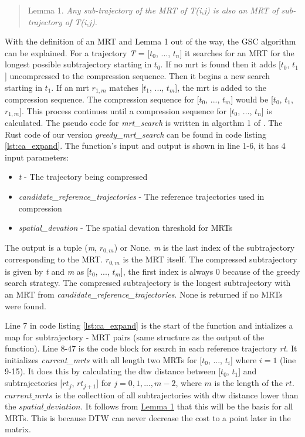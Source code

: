 \begin{quote}
    \label{lemma}
    Lemma 1. \textit{Any sub-trajectory of the MRT of T(i,j) is also an MRT of sub-trajectory of T(i,j).}
\end{quote}

With the definition of an MRT and Lemma 1 out of the way, the GSC algorithm can be explained.
For a trajectory \textit{T} = [$t_0$, ..., $t_n$] it searches for an MRT for the longest possible subtrajectory starting in $t_0$. If no \acrshort{mrt} is found then it adds [$t_0$, $t_1$] uncompressed to the compression sequence. Then it begins a new search starting in $t_1$. If an \acrshort{mrt} $r_{1,m}$ matches [$t_1$, ..., $t_m$], the \acrshort{mrt} is added to the compression sequence. The compression sequence for [$t_0$, ..., $t_m$] would be [$t_0$, $t_1$, $r_{1,m}$]. This process continues until a compression sequence for [$t_0$, ..., $t_n$] is calculated. The pseudo code for \textit{mrt\_search} is written in algorthm 1 of \textcite{zhao2018rest}. The Rust code of our version \textit{greedy\_mrt\_search} can be found in code listing \ref{lst:ca_expand}. The function's input and output is shown in line 1-6, it has 4 input parameters:



\begin{itemize}
    \item{\textit{t} - The trajectory being compressed}
    \item{\textit{candidate\_reference\_trajectories} - The reference trajectories used in compression}
    \item{\textit{spatial\_devation} - The spatial devation threshold for MRTs}
\end{itemize}

The output is a tuple (\textit{m}, $r_{0,m}$) or None. \textit{m} is the last index of the subtrajectory corresponding to the MRT. $r_{0,m}$ is the MRT itself. The compressed subtrajectory is given by \textit{t} and \textit{m} as [$t_0$, ..., $t_m$], the first index is always 0 because of the greedy search strategy. The compressed subtrajectory is the longest subtrajectory with an MRT from \textit{candidate\_reference\_trajectories}. None is returned if no MRTs were found.

Line 7 in code listing \ref{lst:ca_expand} is the start of the function and intializes a map for subtrajectory - MRT pairs (same structure as the output of the function). Line 8-47 is the code block for search in each reference trajectory \textit{rt}. It initializes \textit{current\_mrts} with all length two MRTs for [$t_0$, ..., $t_i$] where $i = 1$ (line 9-15). It does this by calculating the dtw distance between [$t_0$, $t_1$] and subtrajectories [$rt_j$, $rt_{j+1}$] for $j = 0, 1, ..., m-2$, where $m$ is the length of the $rt$. $current\_mrts$ is the collecttion of all subtrajectories with dtw distance lower than the $spatial\_deviation$. It follows from \hyperref[lemma]{Lemma 1} that this will be the basis for all MRTs. This is because DTW can never decrease the cost to a point later in the matrix.

